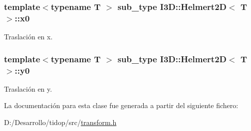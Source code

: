 \subsubsection[{\texorpdfstring{x0}{x0}}]{\setlength{\rightskip}{0pt plus 5cm}template$<$typename T $>$ {\bf sub\+\_\+type} {\bf I3\+D\+::\+Helmert2D}$<$ T $>$\+::x0}\hypertarget{class_i3_d_1_1_helmert2_d_ad0bb6ad335ff383cf85f29a3da60c2e7}{}\label{class_i3_d_1_1_helmert2_d_ad0bb6ad335ff383cf85f29a3da60c2e7}


Traslación en x. 

\subsubsection[{\texorpdfstring{y0}{y0}}]{\setlength{\rightskip}{0pt plus 5cm}template$<$typename T $>$ {\bf sub\+\_\+type} {\bf I3\+D\+::\+Helmert2D}$<$ T $>$\+::y0}\hypertarget{class_i3_d_1_1_helmert2_d_a60ddf8a70434410bc53e610abf583dbe}{}\label{class_i3_d_1_1_helmert2_d_a60ddf8a70434410bc53e610abf583dbe}


Traslación en y. 



La documentación para esta clase fue generada a partir del siguiente fichero\+:\begin{DoxyCompactItemize}
\item 
D\+:/\+Desarrollo/tidop/src/\hyperlink{transform_8h}{transform.\+h}\end{DoxyCompactItemize}
